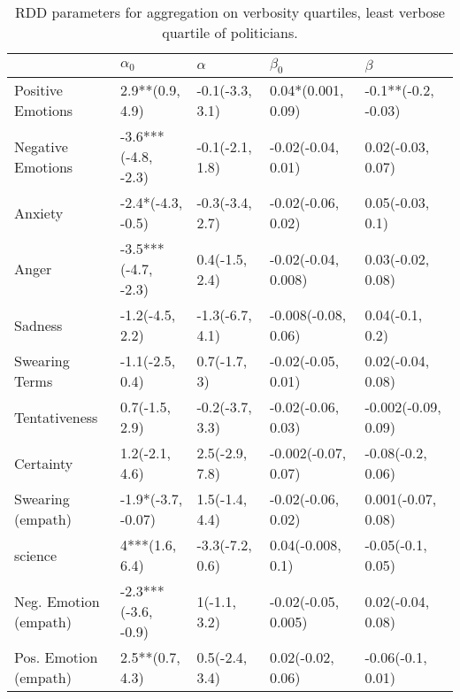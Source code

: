 \begin{table}[h]\centering
\begin{adjustbox}{width=\linewidth, center}
	\begin{tabular}{lllll}
	\toprule
	{} &           $\alpha_0$ &         $\alpha$ &            $\beta_0$ &              $\beta$ \\
	\midrule
	Positive Emotions     &      2.9**(0.9, 4.9) &  -0.1(-3.3, 3.1) &   0.04*(0.001, 0.09) &  -0.1**(-0.2, -0.03) \\
	Negative Emotions     &  -3.6***(-4.8, -2.3) &  -0.1(-2.1, 1.8) &   -0.02(-0.04, 0.01) &    0.02(-0.03, 0.07) \\
	Anxiety               &    -2.4*(-4.3, -0.5) &  -0.3(-3.4, 2.7) &   -0.02(-0.06, 0.02) &     0.05(-0.03, 0.1) \\
	Anger                 &  -3.5***(-4.7, -2.3) &   0.4(-1.5, 2.4) &  -0.02(-0.04, 0.008) &    0.03(-0.02, 0.08) \\
	Sadness               &      -1.2(-4.5, 2.2) &  -1.3(-6.7, 4.1) &  -0.008(-0.08, 0.06) &      0.04(-0.1, 0.2) \\
	Swearing Terms        &      -1.1(-2.5, 0.4) &     0.7(-1.7, 3) &   -0.02(-0.05, 0.01) &    0.02(-0.04, 0.08) \\
	Tentativeness         &       0.7(-1.5, 2.9) &  -0.2(-3.7, 3.3) &   -0.02(-0.06, 0.03) &  -0.002(-0.09, 0.09) \\
	Certainty             &       1.2(-2.1, 4.6) &   2.5(-2.9, 7.8) &  -0.002(-0.07, 0.07) &    -0.08(-0.2, 0.06) \\
	Swearing (empath)     &   -1.9*(-3.7, -0.07) &   1.5(-1.4, 4.4) &   -0.02(-0.06, 0.02) &   0.001(-0.07, 0.08) \\
	science               &       4***(1.6, 6.4) &  -3.3(-7.2, 0.6) &    0.04(-0.008, 0.1) &    -0.05(-0.1, 0.05) \\
	Neg. Emotion (empath) &  -2.3***(-3.6, -0.9) &     1(-1.1, 3.2) &  -0.02(-0.05, 0.005) &    0.02(-0.04, 0.08) \\
	Pos. Emotion (empath) &      2.5**(0.7, 4.3) &   0.5(-2.4, 3.4) &    0.02(-0.02, 0.06) &    -0.06(-0.1, 0.01) \\
	\bottomrule
	\end{tabular}
	
\end{adjustbox}
	\caption{RDD parameters for aggregation on verbosity quartiles, least verbose quartile of politicians.}
	\label{fig: Verbosity_7}
\end{table}

